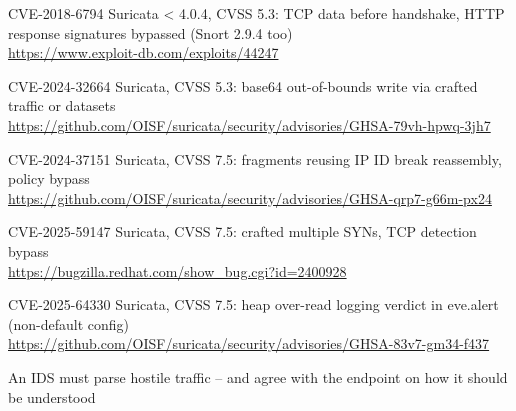 \documentclass[Screen16to9,17pt]{foils}
\begin{document}

\begin{list2}
\item CVE-2018-6794 Suricata < 4.0.4, CVSS 5.3: TCP data before handshake,
      HTTP response signatures bypassed (Snort 2.9.4 too)\\
      \url{https://www.exploit-db.com/exploits/44247}
\item CVE-2024-32664 Suricata, CVSS 5.3: base64 out-of-bounds write
      via crafted traffic or datasets\\
      \url{https://github.com/OISF/suricata/security/advisories/GHSA-79vh-hpwq-3jh7}
\item CVE-2024-37151 Suricata, CVSS 7.5: fragments reusing IP ID break
      reassembly, policy bypass\\
      \url{https://github.com/OISF/suricata/security/advisories/GHSA-qrp7-g66m-px24}
\item CVE-2025-59147 Suricata, CVSS 7.5: crafted multiple SYNs, TCP
      detection bypass\\
      \url{https://bugzilla.redhat.com/show_bug.cgi?id=2400928}
\item CVE-2025-64330 Suricata, CVSS 7.5: heap over-read logging verdict
      in eve.alert (non-default config)\\
      \url{https://github.com/OISF/suricata/security/advisories/GHSA-83v7-gm34-f437}
\end{list2}

\begin{list1}
\item An IDS must parse hostile traffic -- and agree with the endpoint on how it should be understood
\end{list1}


\end{document}
